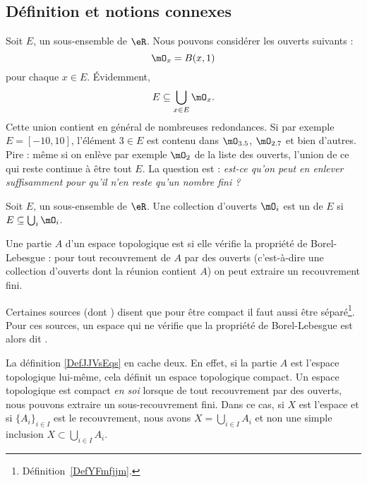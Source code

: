 \subsection{Définition et notions connexes}

Soit \( E\), un sous-ensemble de \( \eR\). Nous pouvons considérer les ouverts suivants :
\begin{equation}
	\mO_x=B(x,1)
\end{equation}
pour chaque \( x\in E\). Évidemment,
\begin{equation}
	E\subseteq \bigcup_{x\in E}\mO_x.
\end{equation}
Cette union contient en général de nombreuses redondances. Si par exemple \( E=[-10,10]\), l'élément \( 3\in E\) est contenu dans \( \mO_{3.5}\), \( \mO_{2.7}\) et bien d'autres. Pire : même si on enlève par exemple \( \mO_2\) de la liste des ouverts, l'union de ce qui reste continue à être tout \( E\). La question est : \emph{est-ce qu'on peut en enlever suffisamment pour qu'il n'en reste qu'un nombre fini ?}

\begin{definition}
	Soit \( E\), un sous-ensemble de \( \eR\). Une collection d'ouverts \( \mO_i\) est un  de \( E\) si \( E\subseteq \bigcup_{i}\mO_i\).
\end{definition}

\begin{definition} \label{DefJJVsEqs}
	Une partie \( A\) d'un espace topologique est  si elle vérifie la propriété de Borel-Lebesgue : pour tout recouvrement de \( A\) par des ouverts (c'est-à-dire une collection d'ouverts dont la réunion contient \( A\)) on peut extraire un recouvrement fini.
\end{definition}


\begin{remark}
	Certaines sources (dont ) disent que pour être compact il faut aussi être séparé\footnote{Définition~\ref{DefYFmfjjm}.}. Pour ces sources, un espace qui ne vérifie que la propriété de Borel-Lebesgue est alors dit .
\end{remark}

\begin{normaltext}
	La définition \ref{DefJJVsEqs} en cache deux. En effet, si la partie \( A\) est l'espace topologique lui-même, cela définit un espace topologique compact. Un espace topologique est compact \emph{en soi} lorsque de tout recouvrement par des ouverts, nous pouvons extraire un sous-recouvrement fini. Dans ce cas, si \( X\) est l'espace et si \( \{ A_i \}_{i\in I}\) est le recouvrement, nous avons \( X=\bigcup_{i\in I}A_i\) et non une simple inclusion \( X\subset \bigcup_{i\in I}A_i\).
\end{normaltext}


